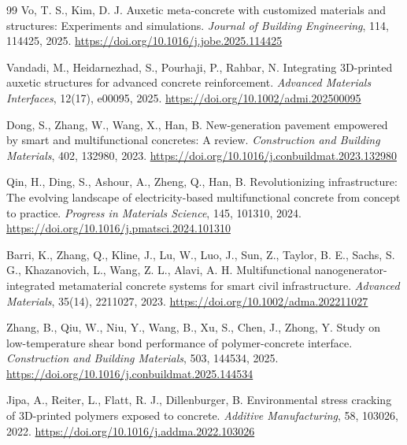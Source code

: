 \documentclass[12pt,a4paper]{article}
\begin{document}
\begin{thebibliography}{99}
	Vo, T. S., Kim, D. J.
	Auxetic meta-concrete with customized materials and structures: Experiments and simulations.
	\textit{Journal of Building Engineering}, 114, 114425, 2025.
	\url{https://doi.org/10.1016/j.jobe.2025.114425}
	
	Vandadi, M., Heidarnezhad, S., Pourhaji, P., Rahbar, N.
	Integrating 3D-printed auxetic structures for advanced concrete reinforcement.
	\textit{Advanced Materials Interfaces}, 12(17), e00095, 2025.
	\url{https://doi.org/10.1002/admi.202500095}
	
	Dong, S., Zhang, W., Wang, X., Han, B.
	New-generation pavement empowered by smart and multifunctional concretes: A review.
	\textit{Construction and Building Materials}, 402, 132980, 2023.
	\url{https://doi.org/10.1016/j.conbuildmat.2023.132980}
	
	Qin, H., Ding, S., Ashour, A., Zheng, Q., Han, B.
	Revolutionizing infrastructure: The evolving landscape of electricity-based multifunctional concrete from concept to practice.
	\textit{Progress in Materials Science}, 145, 101310, 2024.
	\url{https://doi.org/10.1016/j.pmatsci.2024.101310}
	
	Barri, K., Zhang, Q., Kline, J., Lu, W., Luo, J., Sun, Z., Taylor, B. E., Sachs, S. G., Khazanovich, L., Wang, Z. L., Alavi, A. H.
	Multifunctional nanogenerator-integrated metamaterial concrete systems for smart civil infrastructure.
	\textit{Advanced Materials}, 35(14), 2211027, 2023.
	\url{https://doi.org/10.1002/adma.202211027}
	
	Zhang, B., Qiu, W., Niu, Y., Wang, B., Xu, S., Chen, J., Zhong, Y.
	Study on low-temperature shear bond performance of polymer-concrete interface.
	\textit{Construction and Building Materials}, 503, 144534, 2025.
	\url{https://doi.org/10.1016/j.conbuildmat.2025.144534}
	
	Jipa, A., Reiter, L., Flatt, R. J., Dillenburger, B.
	Environmental stress cracking of 3D-printed polymers exposed to concrete.
	\textit{Additive Manufacturing}, 58, 103026, 2022.
	\url{https://doi.org/10.1016/j.addma.2022.103026}
	
\end{thebibliography}
\end{document}
